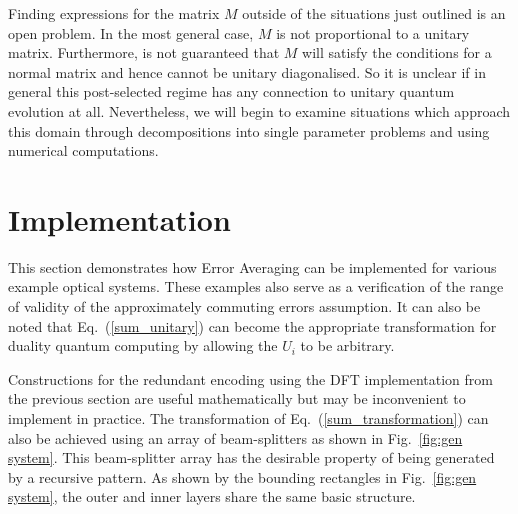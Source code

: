 \documentclass[aps,pra,twocolumn,superscriptaddress,numerical,floatfix]{revtex4-1}
\begin{document}
Finding expressions for the matrix $M$ outside of the situations just outlined is an open problem.  In the most general case, $M$ is not proportional to a unitary matrix.  Furthermore, is not guaranteed that $M$ will satisfy the conditions for a normal matrix and hence cannot be unitary diagonalised.  So it is unclear if in general this post-selected regime has any connection to unitary quantum evolution at all.  Nevertheless, we will begin to examine situations which approach this domain through decompositions into single parameter problems and using numerical computations.

\section{Implementation\label{implementation}}

This section demonstrates how Error Averaging can be implemented for various example optical systems. These examples also serve as a verification of the range of validity of the approximately commuting errors assumption. It can also be noted that Eq.~(\ref{sum_unitary}) can become the appropriate transformation for duality quantum computing by allowing the $U_{i}$ to be arbitrary\cite{dualityQC}.

Constructions for the redundant encoding using the DFT implementation from the previous section are useful mathematically but may be inconvenient to implement in practice.  The transformation of Eq.~(\ref{sum_transformation}) can also be achieved using an array of beam-splitters as shown in Fig.~\ref{fig:gen system}.  This beam-splitter array has the desirable property of being generated by a recursive pattern.  As shown by the bounding rectangles in Fig.~\ref{fig:gen system}, the outer and inner layers share the same basic structure. 
\end{document}
